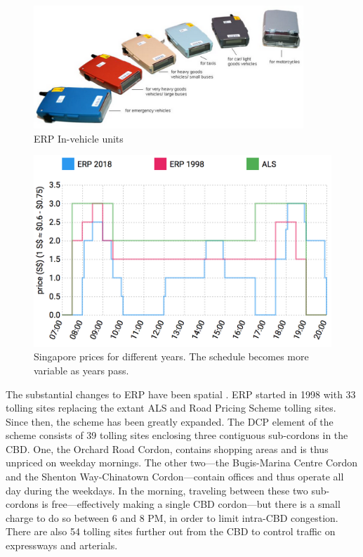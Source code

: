 \begin{figure}
	\includegraphics[width=4in]{../img/singapore-IUs.jpg}
	\caption{ERP In-vehicle units \citep{LTA2016}}
	\label{fig:singapore-IUs}
\end{figure}



\begin{figure}
	\includegraphics[width=1\textwidth]{../img/singapore-prices.png}
	\caption{Singapore prices for different years. The schedule becomes more variable as years pass. }
	\label{fig:singapore-toll-schedule}
\end{figure}

The substantial changes to ERP have been spatial \citep{Chin2009,LTA2018}. ERP started in 1998 with 33 tolling sites replacing the extant ALS and Road Pricing Scheme tolling sites. Since then, the scheme has been greatly expanded. The DCP element of the scheme consists of 39  tolling sites enclosing three contiguous sub-cordons in the CBD. One, the Orchard Road Cordon, contains shopping areas and is thus unpriced on weekday mornings. The other two---the Bugis-Marina Centre Cordon and the Shenton Way-Chinatown Cordon---contain offices and thus operate all day during the weekdays. In the morning, traveling between these two sub-cordons is free---effectively making a single CBD cordon---but there is a small charge to do so between 6 and 8 PM, in order to limit intra-CBD congestion. There are also 54 tolling sites further out from the CBD to control traffic on expressways and arterials. 

